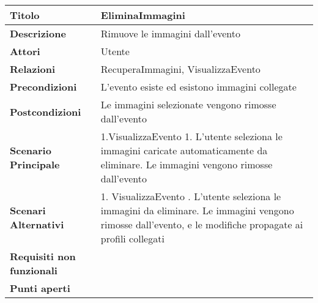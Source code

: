 \begin{tabular} {|P{4.5cm}|P{11cm}|}
  \hline
  \textbf{Titolo}                   & EliminaImmagini                                       \\
  \hline
  \textbf{Descrizione}              & Rimuove le immagini dall'evento                       \\
  \hline
  \textbf{Attori}                   & Utente                                                \\
  \hline
  \textbf{Relazioni}                & RecuperaImmagini, VisualizzaEvento                    \\
  \hline
  \textbf{Precondizioni}            & L'evento esiste ed esistono immagini collegate        \\
  \hline
  \textbf{Postcondizioni}           & Le immagini selezionate vengono rimosse dall'evento   \\
  \hline
  \textbf{Scenario Principale}      & 1.VisualizzaEvento
  1. L'utente seleziona le immagini caricate automaticamente da eliminare. Le immagini vengono rimosse dall'evento                                                \\
  \hline
  \textbf{Scenari Alternativi}      & 1. VisualizzaEvento . L'utente seleziona le immagini da eliminare. Le immagini vengono rimosse dall'evento, e le modifiche propagate ai profili collegati \\
  \hline
  \textbf{Requisiti non funzionali} &                                                       \\
  \hline
  \textbf{Punti aperti}             &                                                       \\
  \hline
\end{tabular}
\hfill
\break

